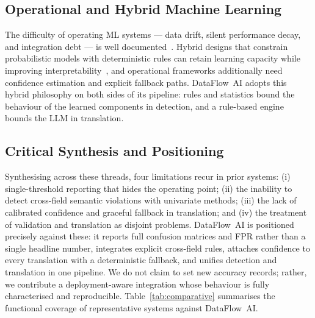 \documentclass{ieeeaccess}
\begin{document}
\subsection{Operational and Hybrid Machine Learning}
The difficulty of operating ML systems --- data drift, silent performance decay, and integration debt --- is well
documented~\cite{sculley2015hidden,neumann1996risks}. Hybrid designs that constrain probabilistic models with
deterministic rules can retain learning capacity while improving interpretability~\cite{lundberg2017unified}, and
operational frameworks additionally need confidence estimation and explicit fallback paths. DataFlow~AI adopts this hybrid
philosophy on both sides of its pipeline: rules and statistics bound the behaviour of the learned components in detection,
and a rule-based engine bounds the LLM in translation.

\subsection{Critical Synthesis and Positioning}
Synthesising across these threads, four limitations recur in prior systems: (i) single-threshold reporting that hides the
operating point; (ii) the inability to detect cross-field semantic violations with univariate methods; (iii) the lack of
calibrated confidence and graceful fallback in translation; and (iv) the treatment of validation and translation as
disjoint problems. DataFlow~AI is positioned precisely against these: it reports full confusion matrices and FPR rather
than a single headline number, integrates explicit cross-field rules, attaches confidence to every translation with a
deterministic fallback, and unifies detection and translation in one pipeline. We do not claim to set new accuracy
records; rather, we contribute a deployment-aware integration whose behaviour is fully characterised and reproducible.
Table~\ref{tab:comparative} summarises the functional coverage of representative systems against DataFlow~AI.
\end{document}
